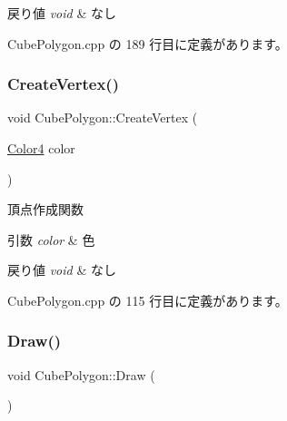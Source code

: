 \begin{DoxyRetVals}{戻り値}
{\em void} & なし \\
\hline
\end{DoxyRetVals}


 Cube\+Polygon.\+cpp の 189 行目に定義があります。

\mbox{\label{class_cube_polygon_ae36048a1ae7b13b6bc8571231b372627}} 
\subsubsection{\texorpdfstring{Create\+Vertex()}{CreateVertex()}}
{\footnotesize\ttfamily void Cube\+Polygon\+::\+Create\+Vertex (\begin{DoxyParamCaption}\item[{\mbox{\hyperlink{_vector3_d_8h_a9c2339f516cf07ce4753b8a99fab3791}{Color4}}}]{color }\end{DoxyParamCaption})\hspace{0.3cm}{\ttfamily [private]}}



頂点作成関数 


\begin{DoxyParams}{引数}
{\em color} & 色 \\
\hline
\end{DoxyParams}

\begin{DoxyRetVals}{戻り値}
{\em void} & なし \\
\hline
\end{DoxyRetVals}


 Cube\+Polygon.\+cpp の 115 行目に定義があります。

\mbox{\label{class_cube_polygon_ac9003cd00eea402f2b6c5fb5a77feae2}} 
\subsubsection{\texorpdfstring{Draw()}{Draw()}}
{\footnotesize\ttfamily void Cube\+Polygon\+::\+Draw (\begin{DoxyParamCaption}{ }\end{DoxyParamCaption})}



